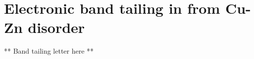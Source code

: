 \documentclass[11pt, twoside]{report}
\begin{document}
\section{Electronic band tailing in {\CZTS} from Cu-Zn disorder}\label{eris_band_tailing}

** Band tailing letter here **\\
\end{document}
